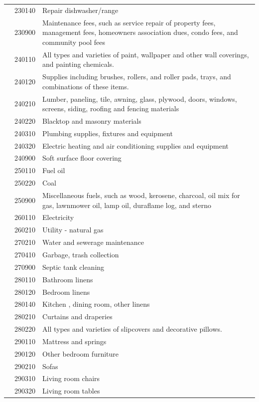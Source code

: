\documentclass[
]{agujournal2019}
\begin{document}
\begin{table}
{\begin{tabular*}{\linewidth}{@{\extracolsep{\fill}}l|rl}
 & 230140 & Repair dishwasher/range \\ 
 & 230900 & Maintenance fees, such as service repair of property fees, management fees, homeowners association dues, condo fees, and community pool fees \\ 
 & 240110 & All types and varieties of paint, wallpaper and other wall coverings, and painting chemicals. \\ 
 & 240120 & Supplies including brushes, rollers, and roller pads, trays, and combinations of these items. \\ 
 & 240210 & Lumber, paneling, tile, awning, glass, plywood, doors, windows, screens, siding, roofing and fencing materials \\ 
 & 240220 & Blacktop and masonry materials \\ 
 & 240310 & Plumbing supplies, fixtures and equipment \\ 
 & 240320 & Electric heating and air conditioning supplies and equipment \\ 
 & 240900 & Soft surface floor covering \\ 
 & 250110 & Fuel oil \\ 
 & 250220 & Coal \\ 
 & 250900 & Miscellaneous fuels, such as wood, kerosene, charcoal, oil mix for gas, lawnmower oil, lamp oil, duraflame log, and sterno \\ 
 & 260110 & Electricity \\ 
 & 260210 & Utility - natural gas \\ 
 & 270210 & Water and sewerage maintenance \\ 
 & 270410 & Garbage, trash collection \\ 
 & 270900 & Septic tank cleaning \\ 
 & 280110 & Bathroom linens \\ 
 & 280120 & Bedroom linens \\ 
 & 280140 & Kitchen , dining room, other linens \\ 
 & 280210 & Curtains and draperies \\ 
 & 280220 & All types and varieties of slipcovers and decorative pillows. \\ 
 & 290110 & Mattress and springs \\ 
 & 290120 & Other bedroom furniture \\ 
 & 290210 & Sofas \\ 
 & 290310 & Living room chairs \\ 
 & 290320 & Living room tables \\ 

\end{tabular*}}
\end{table}
\end{document}
